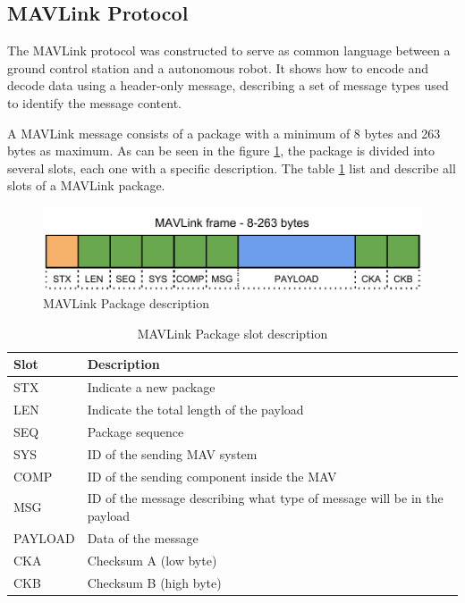 \subsection{MAVLink Protocol} %
\label{sub:mavlink_protocol}

The MAVLink protocol was constructed to serve as common language between a ground control station and a autonomous robot.
It shows how to encode and decode data using a header-only message, describing a set of message types used to identify the message content.

A MAVLink message consists of a package with a minimum of 8 bytes and 263 bytes as maximum.
As can be seen in the figure \ref{fig:mavlink_message}, the package is divided into several slots, each one with a specific description.
The table \ref{table:mavlink_package} list and describe all slots of a MAVLink package.

\begin{figure}
  \centering
  \includegraphics[width=0.9\columnwidth]{img/MAVLinkpackage.pdf}
  \caption{MAVLink Package description}
  \label{fig:mavlink_message}
\end{figure}

\begin{table}
    \begin{tabular}{|m{}|m{}|}
    \hline
    Slot    & Description                                                              \\ \hline
    STX     & Indicate a new package                                                   \\ \hline
    LEN     & Indicate the total length of the payload                                 \\ \hline
    SEQ     & Package sequence                                                         \\ \hline
    SYS     & ID of the sending MAV system                                             \\ \hline
    COMP    & ID of the sending component inside the MAV                               \\ \hline
    MSG     & ID of the message describing what type of message will be in the payload \\ \hline
    PAYLOAD & Data of the message                                                      \\ \hline
    CKA     & Checksum A (low byte)                                                    \\ \hline
    CKB     & Checksum B (high byte)                                                   \\ \hline
    \end{tabular}
    \caption {MAVLink Package slot description}
    \label{table:mavlink_package}
\end{table}

